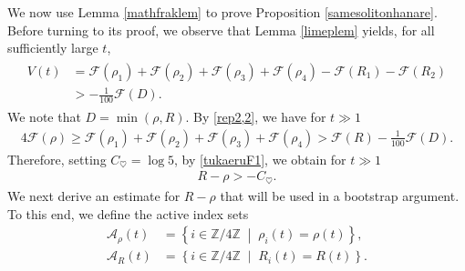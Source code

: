 \documentclass[reqno]{amsart}
\theoremstyle{plain}
\theoremstyle{definition}
\numberwithin{equation}{section}
\begin{document}
We now use Lemma \ref{mathfraklem} to prove Proposition \ref{samesolitonhanare}. Before turning to its proof, we observe that Lemma \ref{limeplem} yields, for all sufficiently large $t$,
\begin{align}\label{rep2,2}
\begin{aligned}
V(t)&=
\mathcal{F}(\rho_1)+\mathcal{F}(\rho_2)+\mathcal{F}(\rho_3)+\mathcal{F}(\rho_4)-\mathcal{F}(R_1)-\mathcal{F}(R_2)
\\
&>-\frac{1}{100}\mathcal{F}(D).
\end{aligned}
\end{align}
We note that $D=\min{(\rho,R)}$. By \eqref{rep2,2}, we have for $t\gg 1$
\begin{align}\label{subsec3.2detukau1}
4\mathcal{F}(\rho)\geq \mathcal{F}(\rho_1)+\mathcal{F}(\rho_2)+\mathcal{F}(\rho_3)+\mathcal{F}(\rho_4)>\mathcal{F}(R)-\frac{1}{100}\mathcal{F}(D).
\end{align}
Therefore, setting $C_{\heartsuit}=\log{5}$, by \eqref{tukaeruF1}, we obtain for $t\gg 1$
\begin{align}\label{taikakues1}
R-\rho>-C_{\heartsuit}.
\end{align}
We next derive an estimate for $R-\rho$ that will be used in a bootstrap argument. To this end, we define the active index sets
\begin{align*}
\mathcal{A}_{\rho}(t)
&=
\left\{
i\in\mathbb{Z}/4\mathbb{Z}
\;\middle|\;
\rho_i(t)=\rho(t)
\right\},
\\
\mathcal{A}_{R}(t)
&=
\left\{
i\in\mathbb{Z}/4\mathbb{Z}
\;\middle|\;
R_i(t)=R(t)
\right\}.
\end{align*}
\end{document}
